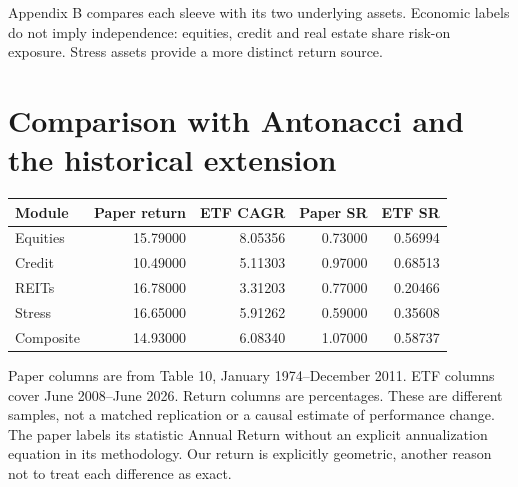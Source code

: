 \documentclass[11pt,letterpaper]{article}
\begin{document}
Appendix B compares each sleeve with its two underlying assets. Economic labels do not imply independence: equities, credit and real estate share risk-on exposure. Stress assets provide a more distinct return source.

\newpage
\section{Comparison with Antonacci and the historical extension}
\begin{center}\small\begin{tabular}{lrrrr}\toprule
Module & Paper return & ETF CAGR & Paper SR & ETF SR\\\midrule
Equities & 15.79000 & 8.05356 & 0.73000 & 0.56994\\
Credit & 10.49000 & 5.11303 & 0.97000 & 0.68513\\
REITs & 16.78000 & 3.31203 & 0.77000 & 0.20466\\
Stress & 16.65000 & 5.91262 & 0.59000 & 0.35608\\
Composite & 14.93000 & 6.08340 & 1.07000 & 0.58737\\
\bottomrule\end{tabular}\end{center}
Paper columns are from Table 10, January 1974--December 2011. ETF columns cover June 2008--June 2026. Return columns are percentages. These are different samples, not a matched replication or a causal estimate of performance change. The paper labels its statistic Annual Return without an explicit annualization equation in its methodology. Our return is explicitly geometric, another reason not to treat each difference as exact.
\end{document}
